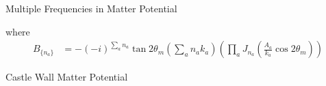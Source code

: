 \documentclass[9pt]{beamer}
\begin{document}
\begin{darkframes}
\begin{frame}{Multiple Frequencies in Matter Potential}
\begin{tcolorbox}[title=Hamiltonian in Rabi Basis]
where
\begin{align*}
    B_{\{n_a\}} &= -(-i)^{\sum_a n_a} \tan 2\theta_m \left( \sum_a n_a k_a \right) \left( \prod_a J_{n_a}\left( \frac{A_a}{k_a}\cos 2\theta_m \right) \right)
\end{align*}




\end{tcolorbox}




\end{frame}



\begin{frame}{Castle Wall Matter Potential}



\begin{columns}[T]
\begin{column}{0.5\textwidth}




\end{column}
\end{columns}
\end{frame}
\end{darkframes}
\end{document}
